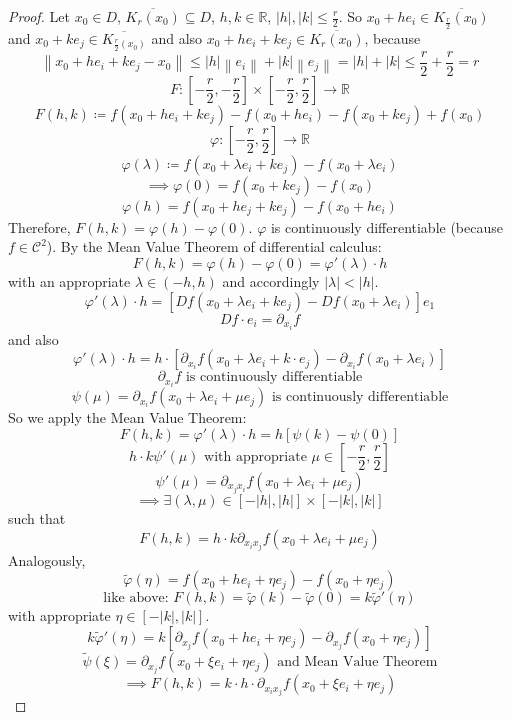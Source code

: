 \documentclass{article}
\newcommand{\norm}[1]{\left\|#1\right\|}
\newcommand{\card}[1]{\left|#1\right|}
\begin{document}
\begin{proof}
  Let $x_0 \in D$, $\overline{K_r(x_0)} \subseteq D$, $h, k \in \mathbb R$, $\card{h}, \card{k} \leq \frac r2$.
  So $x_0 + h e_i \in \overline{K_{\frac r2}(x_0)}$ and $x_0 + ke_j \in \overline{K_{\frac r2(x_0)}}$ and also
  $x_0 + he_i + ke_j \in \overline{K_r(x_0)}$, because
  \[ \norm{x_0 + he_i + ke_j - x_0} \leq \card{h} \norm{e_i} + \card{k} \norm{e_j} = \card{h} + \card{k} \leq \frac r2 + \frac r2 = r \]
  \[ F: \left[-\frac r2, -\frac r2\right] \times \left[-\frac r2, \frac r2\right] \to \mathbb R \]
  \[ F(h, k) \coloneqq f(x_0 + he_i + ke_j) - f(x_0 + he_i) - f(x_0 + ke_j) + f(x_0) \]
  \[ \varphi: \left[-\frac r2, \frac r2\right] \to \mathbb R \]
  \[ \varphi(\lambda) \coloneqq f(x_0 + \lambda e_i + ke_j) - f(x_0 + \lambda e_i) \]
  \[ \implies \varphi(0) = f(x_0 + ke_j) - f(x_0) \]
  \[ \varphi(h) = f(x_0 + he_j + ke_j) - f(x_0 + he_i) \]
  Therefore, $F(h, k) = \varphi(h) - \varphi(0)$.
  $\varphi$ is continuously differentiable (because $f \in \mathcal C^2$).
  By the Mean Value Theorem of differential calculus:
  \[ F(h, k) = \varphi(h) - \varphi(0) = \varphi'(\lambda) \cdot h \]
  with an appropriate $\lambda \in (-h, h)$ and accordingly $\card{\lambda} < \card{h}$.
  \[ \varphi'(\lambda) \cdot h = [Df(x_0 + \lambda e_i + ke_j) - Df(x_0 + \lambda e_i)] e_1 \]
  \[ Df \cdot e_i = \partial_{x_i} f \]
  and also 
  \[ \varphi'(\lambda) \cdot h = h \cdot [\partial_{x_i} f(x_0 + \lambda e_i + k \cdot e_j) - \partial_{x_i} f (x_0 + \lambda e_i)] \]
  \[ \partial_{x_i} f \text{ is continuously differentiable} \]
  \[ \psi(\mu) = \partial_{x_i} f(x_0 + \lambda e_i + \mu e_j) \text{ is continuously differentiable} \]
  So we apply the Mean Value Theorem:
  \[ F(h,k) = \varphi'(\lambda) \cdot h = h [\psi(k) - \psi(0)] \]
  \[ h \cdot k \psi'(\mu) \text{ with appropriate } \mu \in \left[-\frac r2, \frac r2\right] \]
  \[ \psi'(\mu) = \partial_{x_j x_i} f(x_0 + \lambda e_i + \mu e_j) \]
  \[ \implies \exists (\lambda, \mu) \in \left[-\card{h}, \card{h}\right] \times \left[-\card{k}, \card{k}\right] \]
  such that
  \[ F(h, k) = h \cdot k \partial_{x_i x_j} f(x_0 + \lambda e_i + \mu e_j) \]
  Analogously,
  \[ \tilde \varphi(\eta) = f(x_0 + he_i + \eta e_j) - f(x_0 + \eta e_j) \]
  \[ \text{like above: } F(h,k) = \tilde \varphi(k) - \tilde \varphi(0) = k\tilde \varphi'(\eta) \]
  with appropriate $\eta \in \left[-\card{k}, \card{k}\right]$.
  \[ k \tilde \varphi'(\eta) = k \left[\partial_{x_j} f(x_0 + he_i + \eta e_j) - \partial_{x_j} f(x_0 + \eta e_j)\right] \]
  \[ \tilde \psi(\xi) = \partial_{x_j} f(x_0 + \xi e_i + \eta e_j) \text{ and Mean Value Theorem} \]
  \[ \implies F(h, k) = k \cdot h \cdot \partial_{x_i x_j} f(x_0 + \xi e_i + \eta e_j) \]


\end{proof}
\end{document}
